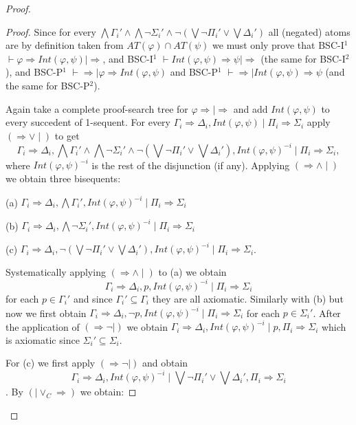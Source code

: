\documentclass[11pt,a4paper,titlepage]{article}
\theoremstyle{definition}
\newcommand{\3}{\vspace{.3in}}
\newcommand{\2}{\vspace{.2in}}
\newcommand{\1}{\vspace{.1in}}
\newcommand{\5}{\vspace{.05in}}
\begin{document}
\begin{proof}
\begin{proof}
Since for every $\bigwedge\Gamma_i'\wedge \bigwedge\neg\Sigma_i'\wedge \neg(\bigvee\neg\Pi_i'\vee\bigvee\Delta_i')$ all (negated) atoms are by definition taken from  $AT(\varphi)\cap AT(\psi)$ we must
only prove that BSC-I$^1$ $\vdash\varphi\Rightarrow Int(\varphi, \psi)\mid\Rightarrow$, and BSC-I$^1$ $\vdash Int(\varphi, \psi) \Rightarrow\psi\mid\Rightarrow$ (the same for BSC-I$^2$), and BSC-P$^1$ $\vdash\Rightarrow\mid\varphi\Rightarrow Int(\varphi, \psi)$ and BSC-P$^1$ $\vdash \Rightarrow \mid Int(\varphi, \psi) \Rightarrow\psi$ (and the same for BSC-P$^2$). 

Again take a complete proof-search tree for $\varphi\Rightarrow\mid\Rightarrow$ and add $Int(\varphi, \psi)$ to every succedent of 1-sequent. For every $\Gamma_i\Rightarrow\Delta_i, Int(\varphi, \psi)\mid\Pi_i\Rightarrow\Sigma_i$
apply $(\Rightarrow\vee\mid)$ to get $$\Gamma_i\Rightarrow\Delta_i, \bigwedge\Gamma_i'\wedge \bigwedge\neg\Sigma_i'\wedge \neg(\bigvee\neg\Pi_i'\vee\bigvee\Delta_i'), Int(\varphi, \psi)^{-i}\mid\Pi_i\Rightarrow\Sigma_i,$$ where $Int(\varphi, \psi)^{-i}$
is the rest of the disjunction (if any). Applying $(\Rightarrow\wedge\mid)$  we obtain three bisequents:

\1

(a) $\Gamma_i\Rightarrow\Delta_i, \bigwedge\Gamma_i', Int(\varphi, \psi)^{-i}\mid\Pi_i\Rightarrow\Sigma_i$

(b) $\Gamma_i\Rightarrow\Delta_i, \bigwedge\neg\Sigma_i', Int(\varphi, \psi)^{-i}\mid\Pi_i\Rightarrow\Sigma_i$

(c) $\Gamma_i\Rightarrow\Delta_i, \neg(\bigvee\neg\Pi_i'\vee\bigvee\Delta_i'), Int(\varphi, \psi)^{-i}\mid\Pi_i\Rightarrow\Sigma_i$.

\1

Systematically applying $(\Rightarrow\wedge\mid)$  to (a) we obtain 
$$\Gamma_i\Rightarrow\Delta_i, p, Int(\varphi, \psi)^{-i}\mid\Pi_i\Rightarrow\Sigma_i$$ for each $p\in \Gamma_i'$ and since $\Gamma_i'\subseteq\Gamma_i$ they are all axiomatic. Similarly with (b) but now we first obtain $\Gamma_i\Rightarrow\Delta_i, \neg p, Int(\varphi, \psi)^{-i}\mid\Pi_i\Rightarrow\Sigma_i$ for each $p\in \Sigma_i'$. After the application of $(\Rightarrow\neg\mid)$ we obtain $\Gamma_i\Rightarrow\Delta_i, Int(\varphi, \psi)^{-i}\mid p, \Pi_i\Rightarrow\Sigma_i$ which is axiomatic since $\Sigma_i'\subseteq\Sigma_i$.

For (c) we first apply $(\Rightarrow\neg\mid)$ and obtain $$\Gamma_i\Rightarrow\Delta_i, Int(\varphi, \psi)^{-i}\mid \bigvee\neg\Pi_i'\vee\bigvee\Delta_i', \Pi_i\Rightarrow\Sigma_i$$. By $(\mid\vee_C\Rightarrow)$ we obtain:


\end{proof}
\end{proof}
\end{document}
